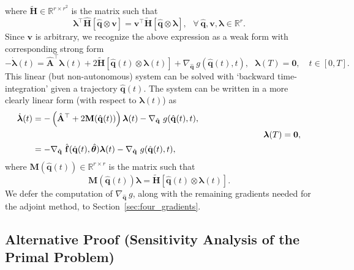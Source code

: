where $\tilde{\mathbf{H}}\in\mathbb{R}^{r\times r^2}$ is the matrix such that\\
$$\bm{\lambda}^{\top}\hat{\mathbf{H}}[\hat{\mathbf{q}}\otimes \mathbf{v}] = \mathbf{v}^{\top}\tilde{\mathbf{H}}[\hat{\mathbf{q}}\otimes \bm{\lambda}],~~~\forall~\hat{\mathbf{q}}, \mathbf{v}, \bm{\lambda} \in \mathbb{R}^r.$$
Since $\mathbf{v}$ is arbitrary, we recognize the above expression as a weak form with corresponding strong form\\
\begin{equation*}
    -\dot{\bm{\lambda}}(t) = \hat{\mathbf{A}}^{\top} \bm{\lambda}(t) + 2\tilde{\mathbf{H}}[\hat{\mathbf{q}}(t)\otimes \bm{\lambda}(t)] + \nabla_{\hat{\mathbf{q}}}~g(\hat{\mathbf{q}}(t),t),~~~\bm{\lambda}(T)=\bm{0},\quad t\in [0,T].
\end{equation*}
This linear (but non-autonomous) system can be solved with `backward time-integration' given a trajectory $\hat{\mathbf{q}}(t)$. The system can be written in a more clearly linear form (with respect to $\bm{\lambda}(t)$) as\\
\begin{align}
    \label{eq:gradient_fq}
     \dot{\bm{\lambda}}(t) &= -\left(\hat{\mathbf{A}}^{\top} + 2\mathbf{M}(\hat{\mathbf{q}}(t))\right)\bm{\lambda}(t) - \nabla_{\hat{\mathbf{q}}}~g(\hat{\mathbf{q}}(t),t),\notag\\
    &~\hspace{8.8cm}~~~~~\bm{\lambda}(T)=\bm{0},\\
    &= -\nabla_{\hat{\mathbf{q}}}~\hat{\mathbf{f}}(\hat{\mathbf{q}}(t),\hat{\bm{\theta}})\bm{\lambda}(t) - \nabla_{\hat{\mathbf{q}}}~g(\hat{\mathbf{q}}(t),t)\notag,
\end{align}
where $\mathbf{M}(\hat{\mathbf{q}}(t))\in\mathbb{R}^{r\times r}$ is the matrix such that\\
\begin{equation*}
    \mathbf{M}(\hat{\mathbf{q}}(t)) \bm{\lambda} = \tilde{\mathbf{H}}[\hat{\mathbf{q}}(t)\otimes \bm{\lambda}(t)].
\end{equation*}
We defer the computation of $\nabla_{\hat{\mathbf{q}}}~g$, along with the remaining gradients needed for the adjoint method, to Section~\ref{sec:four_gradients}.




\subsection*{Alternative Proof (Sensitivity Analysis of the Primal Problem)}

